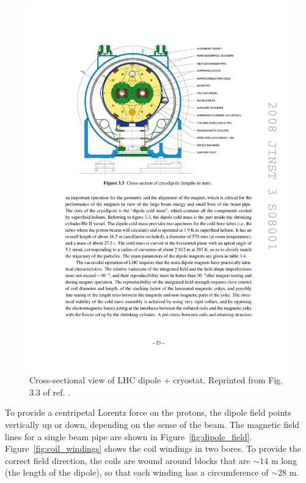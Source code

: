 \documentclass[dissertation.tex]{subfiles}
\begin{document}
\begin{figure}
	\centering
	\includegraphics[scale=1.0]{LHC_dipole_cross_section}
	\caption{Cross-sectional view of LHC dipole + cryostat.  Reprinted from Fig. 3.3 of ref. \cite{1748-0221-3-08-S08001}.}
	\label{fig:LHC_dipole_cross_section}
\end{figure}

To provide a centripetal Lorentz force on the protons, the dipole field points vertically up or down, depending on the sense of the beam.  The magnetic field lines for a single beam pipe are shown in Figure~\ref{fig:dipole_field}.  Figure~\ref{fig:coil_windings} shows the coil windings in two bores.  To provide the correct field direction, the coils are wound around blocks that are $\sim14$ m long (the length of the dipole), so that each winding has a circumference of $\sim28$ m.
\end{document}
